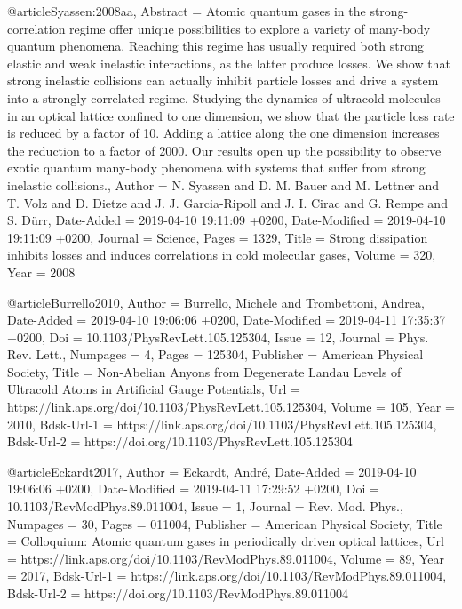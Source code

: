 \documentclass[epj,final]{svjour}
\begin{document}
{@article{Syassen:2008aa,
	Abstract = {Atomic quantum gases in the strong-correlation regime offer unique possibilities to explore a variety of many-body quantum phenomena. Reaching this regime has usually required both strong elastic and weak inelastic interactions, as the latter produce losses. We show that strong inelastic collisions can actually inhibit particle losses and drive a system into a strongly-correlated regime. Studying the dynamics of ultracold molecules in an optical lattice confined to one dimension, we show that the particle loss rate is reduced by a factor of 10. Adding a lattice along the one dimension increases the reduction to a factor of 2000. Our results open up the possibility to observe exotic quantum many-body phenomena with systems that suffer from strong inelastic collisions.},
	Author = {N. Syassen and D. M. Bauer and M. Lettner and T. Volz and D. Dietze and J. J. Garcia-Ripoll and J. I. Cirac and G. Rempe and S. D{\"u}rr},
	Date-Added = {2019-04-10 19:11:09 +0200},
	Date-Modified = {2019-04-10 19:11:09 +0200},
	Journal = {Science},
	Pages = {1329},
	Title = {Strong dissipation inhibits losses and induces correlations in cold molecular gases},
	Volume = {320},
	Year = {2008}}

@article{Burrello2010,
	Author = {Burrello, Michele and Trombettoni, Andrea},
	Date-Added = {2019-04-10 19:06:06 +0200},
	Date-Modified = {2019-04-11 17:35:37 +0200},
	Doi = {10.1103/PhysRevLett.105.125304},
	Issue = {12},
	Journal = {Phys. Rev. Lett.},
	Numpages = {4},
	Pages = {125304},
	Publisher = {American Physical Society},
	Title = {Non-Abelian Anyons from Degenerate Landau Levels of Ultracold Atoms in Artificial Gauge Potentials},
	Url = {https://link.aps.org/doi/10.1103/PhysRevLett.105.125304},
	Volume = {105},
	Year = {2010},
	Bdsk-Url-1 = {https://link.aps.org/doi/10.1103/PhysRevLett.105.125304},
	Bdsk-Url-2 = {https://doi.org/10.1103/PhysRevLett.105.125304}}

@article{Eckardt2017,
	Author = {Eckardt, Andr\'e},
	Date-Added = {2019-04-10 19:06:06 +0200},
	Date-Modified = {2019-04-11 17:29:52 +0200},
	Doi = {10.1103/RevModPhys.89.011004},
	Issue = {1},
	Journal = {Rev. Mod. Phys.},
	Numpages = {30},
	Pages = {011004},
	Publisher = {American Physical Society},
	Title = {Colloquium: Atomic quantum gases in periodically driven optical lattices},
	Url = {https://link.aps.org/doi/10.1103/RevModPhys.89.011004},
	Volume = {89},
	Year = {2017},
	Bdsk-Url-1 = {https://link.aps.org/doi/10.1103/RevModPhys.89.011004},
	Bdsk-Url-2 = {https://doi.org/10.1103/RevModPhys.89.011004}}

}
\end{document}
